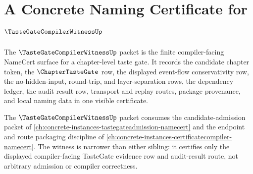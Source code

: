 \chapter{A Concrete Naming Certificate for $\TasteGateCompilerWitnessUp$}
\label{ch:concrete-instances-tastegatecompilerwitness-namecert}

The $\TasteGateCompilerWitnessUp$ packet is the finite compiler-facing NameCert surface for a chapter-level taste gate. It records the candidate chapter token, the $\ChapterTasteGate$ row, the displayed event-flow conservativity row, the no-hidden-input, round-trip, and layer-separation rows, the dependency ledger, the audit result row, transport and replay routes, package provenance, and local naming data in one visible certificate.

The $\TasteGateCompilerWitnessUp$ packet consumes the candidate-admission packet of \autoref{ch:concrete-instances-tastegateadmission-namecert} and the endpoint and route packaging discipline of \autoref{ch:concrete-instances-certificatecompiler-namecert}. The witness is narrower than either sibling: it certifies only the displayed compiler-facing TasteGate evidence row and audit-result route, not arbitrary admission or compiler correctness.


